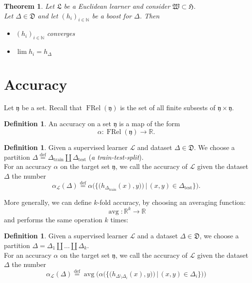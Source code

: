 \documentclass{book}
\theoremstyle{plain}
\newtheorem{theorem}[corollary]{Theorem}
\theoremstyle{definition}
\newtheorem{definition}[corollary]{Definition}
\DeclareMathOperator{\avg}{avg}
\renewcommand{\d}[1]{\mathbb{#1}}
\newcommand{\define}{\stackrel{\operatorname{def}}{=}}
\newcommand{\f}[1]{\mathfrak{#1}}
\DeclareMathOperator{\FRel}{FRel}
\newcommand{\mor}{\longrightarrow}
\renewcommand{\r}[1]{\mathcal{#1}}
\DeclareMathOperator{\test}{test}
\DeclareMathOperator{\train}{train}
\begin{document}
\begin{theorem}
Let $\f{L}$ be a Euclidean learner and consider $\f{W}\subset \f{H}$.\\ Let $\Delta \in \f{D}$ and let $(h_i)_{i \in \d{N}}$ be a boost for $\Delta$. Then 
\begin{itemize}
\item $(h_i)_{i \in \d{N}}$ converges
\item $\lim h_i = h_\Delta$
\end{itemize}
\end{theorem}






\section{Accuracy}
Let $\f{y}$ be a set. Recall that $\FRel(\f{y})$ is the set of all finite subsests of $\f{y}\times \f{y}$.
\begin{definition}
An accuracy on a set $\f{y}$ is a map of the form
\[
\alpha: \FRel(\f{y})\mor \d{R}.
\]
\end{definition}
\begin{definition}
Given a supervised learner $\r{L}$ and dataset $\Delta \in \f{D}$. We choose a partition $\Delta \define \Delta_{\train}\coprod \Delta_{\test}$ (\emph{a train-test-split}).\\
For an accuracy $\alpha$ on the target set $\f{y}$, we call the accuracy of $\r{L}$ given the dataset $\Delta$ the number
\[
\alpha_\r{L}(\Delta)\define \alpha  \bigg(  \big\{ \big( h_{\Delta_{\train}}  (x),y)  \big) \,\bigg\vert \,(x,y)\in \Delta_{\test} \big\}\bigg).
\]
\end{definition}

\noindent More generally, we can define $k$-fold accuracy, by choosing an averaging function:
\[
\avg: \d{R}^k\mor \d{R}
\]
and performs the same operation $k$ times:
\begin{definition}
Given a supervised learner $\r{L}$ and a dataset $\Delta \in \f{D}$, we choose a partition $\Delta = \Delta_1 \coprod \ldots \coprod \Delta_k$.\\
For an accuracy $\alpha$ on the target set $\f{y}$, we call the accuracy of $\r{L}$ given the dataset $\Delta$ the number
\[
\alpha_\r{L}(\Delta)\define \avg\bigg(\alpha\big(\big\{ \big( h_{\Delta\setminus \Delta_i}(x),y)  \big) \,\bigg\vert \,(x,y)\in \Delta_i \big\}\big)\bigg)
\]
\end{definition}
\end{document}
